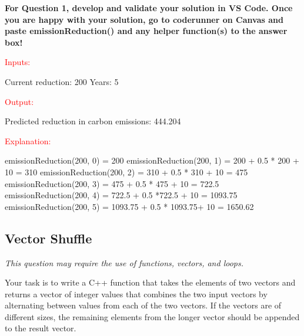 \textbf{For Question 1, develop and validate your solution in VS Code. Once you are happy with your solution, go to coderunner on Canvas and paste emissionReduction() and any helper function(s) to the answer box!}

\begin{sample}
\textcolor{red}{Inputs:}

Current reduction: 200 \newline
Years: 5

\textcolor{red}{Output:}

Predicted reduction in carbon emissions: 444.204

\textcolor{red}{Explanation:}

emissionReduction(200, 0) = 200 \newline
emissionReduction(200, 1) = 200 + 0.5 * 200 + 10 = 310 \newline
emissionReduction(200, 2) = 310 + 0.5 * 310 + 10 = 475\newline
emissionReduction(200, 3) = 475 + 0.5 * 475 + 10 = 722.5 \newline
emissionReduction(200, 4) = 722.5 + 0.5 *722.5 + 10 = 1093.75 \newline
emissionReduction(200, 5) = 1093.75 + 0.5 * 1093.75+ 10 = 1650.62

\end{sample}


\subsection{Vector Shuffle} 
\textit{This question may require the use of functions, vectors, and loops.}

Your task is to write a C++ function that takes the elements of two vectors and returns a vector of integer values that combines the two input vectors by alternating between values from each of the two vectors. If the vectors are of different sizes, the remaining elements from the longer vector should be appended to the result vector.

